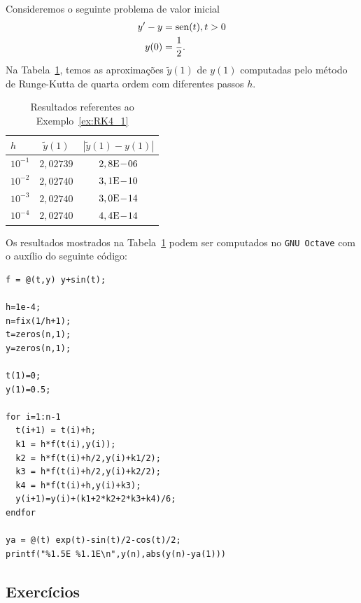 \begin{ex}\label{ex:RK4_1}
  Consideremos o seguinte problema de valor inicial
  \begin{align}
    y' - y &= \operatorname{sen}(t), t>0\\
    y(0) &= \frac{1}{2}.
  \end{align}
  Na Tabela~\ref{tab:ex_RK4_1}, temos as aproximações $\tilde{y}(1)$ de $y(1)$ computadas pelo método de Runge-Kutta de quarta ordem com diferentes passos $h$.
 
  \begin{table}[h!]
    \centering
    \begin{tabular}{l|cc}
      $h$ & $\tilde{y}(1)$ & $|\tilde{y}(1)-y(1)|$\\\hline
      $10^{-1}$ & $2,02739$ & $2,8\mathrm{E}\!-\!06$ \\
      $10^{-2}$ & $2,02740$ & $3,1\mathrm{E}\!-\!10$ \\
      $10^{-3}$ & $2,02740$ & $3,0\mathrm{E}\!-\!14$ \\
      $10^{-4}$ & $2,02740$ & $4,4\mathrm{E}\!-\!14$ \\\hline
    \end{tabular}
    \caption{Resultados referentes ao Exemplo~\ref{ex:RK4_1}}
    \label{tab:ex_RK4_1}
  \end{table}

\ifisoctave
Os resultados mostrados na Tabela~\ref{tab:ex_RK4_1} podem ser computados no \verb+GNU Octave+ com o auxílio do seguinte código:
\begin{verbatim}
f = @(t,y) y+sin(t);

h=1e-4;
n=fix(1/h+1);
t=zeros(n,1);
y=zeros(n,1);

t(1)=0;
y(1)=0.5;

for i=1:n-1
  t(i+1) = t(i)+h;
  k1 = h*f(t(i),y(i));
  k2 = h*f(t(i)+h/2,y(i)+k1/2);
  k3 = h*f(t(i)+h/2,y(i)+k2/2);
  k4 = h*f(t(i)+h,y(i)+k3);
  y(i+1)=y(i)+(k1+2*k2+2*k3+k4)/6;
endfor

ya = @(t) exp(t)-sin(t)/2-cos(t)/2;
printf("%1.5E %1.1E\n",y(n),abs(y(n)-ya(1)))
\end{verbatim}
\fi
\end{ex}

\subsection*{Exercícios}

